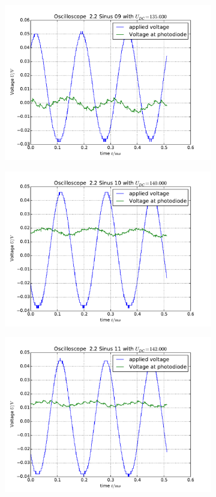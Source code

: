 \begin{figure}
\begin{subfigure}[b]{\picwidth}
        \includegraphics[width=\textwidth]{analysis/figures/22sinus09}
        \caption{}
    \end{subfigure}
    \begin{subfigure}[b]{\picwidth}
        \includegraphics[width=\textwidth]{analysis/figures/22sinus10}
        \caption{}
    \end{subfigure}
    \begin{subfigure}[b]{\picwidth}
        \includegraphics[width=\textwidth]{analysis/figures/22sinus11}

\end{subfigure}
\end{figure}
